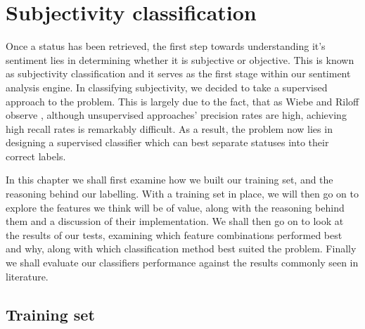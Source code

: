 % 			
% 
% 
% 
% 
% 
% 

% 
% 

\chapter{Subjectivity classification}
\label{subjectivity}

Once a status has been retrieved, the first step towards understanding it's sentiment lies in determining whether it is subjective or objective. This is known as subjectivity classification and it serves as the first stage within our sentiment analysis engine. In classifying subjectivity, we decided to take a supervised approach to the problem. This is largely due to the fact, that as Wiebe and Riloff observe \cite{Wiebe:2003wa}, although unsupervised approaches' precision rates are high, achieving high recall rates is remarkably difficult. As a result, the problem now lies in designing a supervised classifier which can best separate statuses into their correct labels.

In this chapter we shall first examine how we built our training set, and the reasoning behind our labelling. With a training set in place, we will then go on to explore the features we think will be of value, along with the reasoning behind them and a discussion of their implementation. We shall then go on to look at the results of our tests, examining which feature combinations performed best and why, along with which classification method best suited the problem. Finally we shall evaluate our classifiers performance against the results commonly seen in literature.

\section{Training set}
\label{subjectvity:training}


